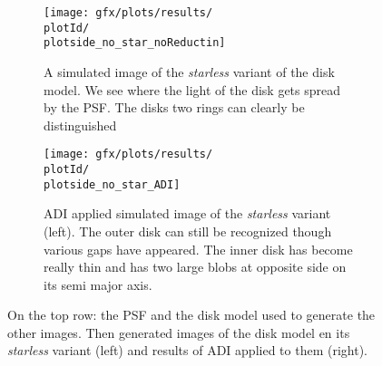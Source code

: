 \begin{figure}[!hbt]
{\begin{minipage}[t]{1.2\textwidth}
      \begin{subfigure}[t]{0.6\textwidth}
        \centering
        \texttt{[image: gfx/plots/results/\\plotId/\\plotside\_no\_star\_noReductin]}
        \caption[]{A simulated image of the \textit{starless} variant of the disk model. We see where the light of the disk gets spread by the PSF. The disks two rings can clearly be distinguished}
      \end{subfigure}%
      \begin{subfigure}[t]{0.6\textwidth}
        \centering
        \texttt{[image: gfx/plots/results/\\plotId/\\plotside\_no\_star\_ADI]}
        \caption[]{\ac{ADI} applied simulated image of the \textit{starless} variant (left). The outer disk can still be recognized though various gaps have appeared. The inner disk has become really thin and has two large blobs at opposite side on its semi major axis.}
      \end{subfigure}
  \end{minipage}
  }%

  \caption[]{On the top row: the \ac{PSF} and the disk model used to generate the other images. Then generated images of the disk model en its \textit{starless} variant (left) and results of \ac{ADI} applied to them (right).}
  \label{fig:\plotside:apd\plotId}
\end{figure}
